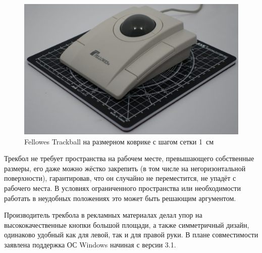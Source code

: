 \documentclass[11pt, a4paper]{article}
\begin{document}
\begin{figure}[h]
    \centering
    \includegraphics[scale=0.25]{1997_fellowes_trackball/fellowsset.jpg}
    \caption{Fellowes Trackball на размерном коврике с шагом сетки 1~см}
    \label{fig:size}
\end{figure}

Трекбол не требует пространства на рабочем месте, превышающего собственные размеры, его даже можно жёстко закрепить (в том числе на негоризонтальной поверхности), гарантировав, что он случайно не переместится, не упадёт с рабочего места. В условиях ограниченного пространства или необходимости работать в неудобных положениях это может быть решающим аргументом.

Производитель трекбола в рекламных материалах делал упор на высококачественные кнопки большой площади, а также симметричный дизайн, одинаково удобный как для левой, так и для правой руки. В плане совместимости заявлена поддержка ОС Windows начиная с версии 3.1.
\end{document}
